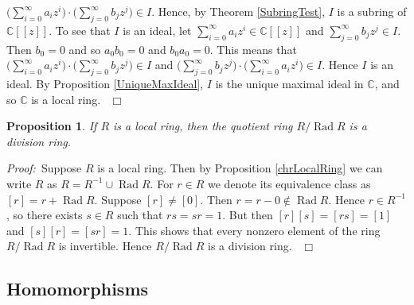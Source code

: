 \documentclass[12pt, oneside]{book}
\newtheorem{proposition}[theorem]{Proposition}
\newtheorem{remark}[theorem]{Remark}
\newcommand{\proof}{{\noindent \it Proof:~}}
\newcommand{\qed}{\hfill ~$\Box$\\}
\def\Rad{\operatorname{Rad}}
\begin{document}
$\big(\displaystyle \sum_{i = 0}^{\infty} a_iz^i\big) \cdot \big( \displaystyle \sum_{j = 0}^{\infty} b_jz^j \big) \in I$. 
Hence, by Theorem \ref{SubringTest}, $I$ is a subring of $\mathbb{C}[[z]]$.
\vskip 0.3cm
\noindent To see that $I$ is an ideal, let 
$\displaystyle \sum_{i = 0}^{\infty} a_iz^i \in \mathbb{C}[[z]]$ and  
$\displaystyle \sum_{j = 0}^{\infty} b_jz^j \in I$. Then $b_0 = 0$ and so $a_0 b_0 = 0$ and $b_0 a_0 = 0$.
This means that  
$\big(\displaystyle \sum_{i = 0}^{\infty} a_iz^i\big) \cdot \big( \displaystyle \sum_{j = 0}^{\infty} b_jz^j \big) \in I$ and $\big( \displaystyle \sum_{j = 0}^{\infty} b_jz^j \big) \cdot  \big(\displaystyle \sum_{i = 0}^{\infty} a_iz^i\big) \in I$. 
Hence $I$ is an ideal. By Proposition \ref{UniqueMaxIdeal}, $I$ is the unique maximal ideal in 
$\mathbb{C}$, and so $\mathbb{C}$ is a local ring.
 \qed
\begin{proposition}
\normalfont
\noindent If $R$ is a local ring, then the quotient ring $R / \Rad R$ is a division ring. 
\end{proposition}

\proof \space Suppose $R$ is a local ring. Then by Proposition \ref{chrLocalRing} we can write $R$ 
as $R = R^{-1} \cup \Rad R$. For $r \in R$ we denote its equivalence class as $[r] = r + \Rad R$. 
Suppose $[r] \neq [0]$. Then $r = r - 0 \notin \Rad R$. Hence $r \in R^{-1}$, so there exists 
$s \in R$ such that $rs = sr = 1$. But then $[r][s] = [rs] = [1]$ and $[s][r] = [sr] = 1$. 
This shows that every nonzero element of the ring $R / \Rad R$ is invertible. 
Hence $R / \Rad R$ is a division ring. \qed

\subsection{Homomorphisms}
\end{document}
